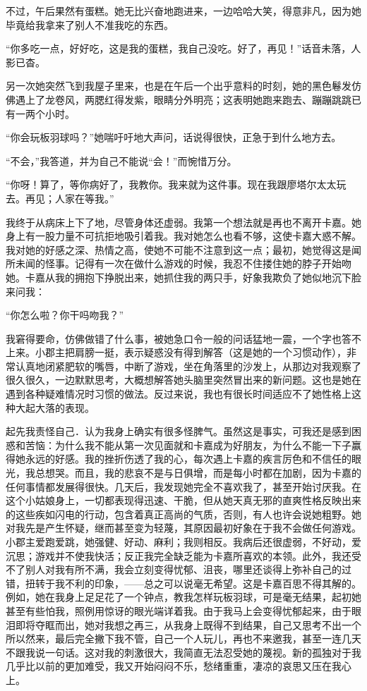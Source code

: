 \documentclass[12pt, UTF8]{ctexbook}
\begin{document}
\par 不过，午后果然有蛋糕。她无比兴奋地跑进来，一边哈哈大笑，得意非凡，因为她毕竟给我拿来了别人不准我吃的东西。
\par “你多吃一点，好好吃，这是我的蛋糕，我自己没吃。好了，再见！”话音未落，人影已杳。
\par 另一次她突然飞到我屋子里来，也是在午后一个出乎意料的时刻，她的黑色鬈发仿佛遇上了龙卷风，两腮红得发紫，眼睛分外明亮；这表明她跑来跑去、蹦蹦跳跳已有一两个小时。
\par “你会玩板羽球吗？”她喘吁吁地大声问，话说得很快，正急于到什么地方去。
\par “不会，”我答道，并为自己不能说“会！”而惋惜万分。
\par “你呀！算了，等你病好了，我教你。我来就为这件事。现在我跟廖塔尔太太玩去。再见；人家在等我。”
\par 我终于从病床上下了地，尽管身体还虚弱。我第一个想法就是再也不离开卡嘉。她身上有一股力量不可抗拒地吸引着我。我对她怎么也看不够，这使卡嘉大惑不解。我对她的好感之深、热情之高，使她不可能不注意到这一点；最初，她觉得这是闻所未闻的怪事。记得有一次在做什么游戏的时候，我忍不住搂住她的脖子开始吻她。卡嘉从我的拥抱下挣脱出来，她抓住我的两只手，好象我欺负了她似地沉下脸来问我：
\par “你怎么啦？你干吗吻我？”
\par 我窘得要命，仿佛做错了什么事，被她急口令一般的问话猛地一震，一个字也答不上来。小郡主把肩膀一挺，表示疑惑没有得到解答（这是她的一个习惯动作），非常认真地闭紧肥软的嘴唇，中断了游戏，坐在角落里的沙发上，从那边对我观察了很久很久，一边默默思考，大概想解答她头脑里突然冒出来的新问题。这也是她在遇到各种疑难情况时习惯的做法。反过来说，我也有很长时间适应不了她性格上这种大起大落的表现。
\par 起先我责怪自己．认为我身上确实有很多怪脾气。虽然这是事实，可我还是感到困惑和苦恼：为什么我不能从第一次见面就和卡嘉成为好朋友，为什么不能一下子赢得她永远的好感。我的挫折伤透了我的心，每次遇上卡嘉的疾言厉色和不信任的眼光，我总想哭。而且，我的悲哀不是与日俱增，而是每小时都在加剧，因为卡嘉的任何事情都发展得很快。几天后，我发现她完全不喜欢我了，甚至开始讨厌我。在这个小姑娘身上，一切都表现得迅速、干脆，但从她天真无邪的直爽性格反映出来的这些疾如闪电的行动，包含着真正高尚的气质，否则，有人也许会说她粗野。她对我先是产生怀疑，继而甚至变为轻蔑，其原因最初好象在于我不会做任何游戏。小郡主爱跑爱跳，她强健、好动、麻利；我则相反。我病后还很虚弱，不好动，爱沉思；游戏并不使我快活；反正我完全缺乏能为卡嘉所喜欢的本领。此外，我还受不了别人对我有所不满，我会立刻变得忧郁、沮丧，哪里还谈得上弥补自己的过错，扭转于我不利的印象，——总之可以说毫无希望。这是卡嘉百思不得其解的。例如，她在我身上足足花了一个钟点，教我怎样玩板羽球，可是毫无结果，起初她甚至有些怕我，照例用惊讶的眼光端详着我。由于我马上会变得忧郁起来，由于眼泪即将夺眶而出，她对我想之再三，从我身上既得不到结果，自己又思考不出一个所以然来，最后完全撇下我不管，自己一个人玩儿，再也不来邀我，甚至一连几天不跟我说一句话。这对我的刺激很大，我简直无法忍受她的蔑视。新的孤独对于我几乎比以前的更加难受，我又开始闷闷不乐，愁绪重重，凄凉的哀思又压在我心上。
\end{document}
